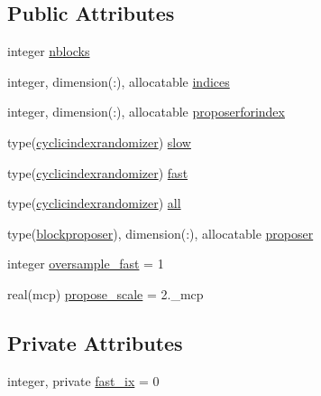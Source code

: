 \subsection*{Public Attributes}
\begin{DoxyCompactItemize}
\item 
integer \mbox{\hyperlink{structpropose_1_1blockedproposer_adba94de280db481ba40efdb3bdd6e696}{nblocks}}
\item 
integer, dimension(\+:), allocatable \mbox{\hyperlink{structpropose_1_1blockedproposer_acbf4ad1e59f261b8484ac0fcef24dc6c}{indices}}
\item 
integer, dimension(\+:), allocatable \mbox{\hyperlink{structpropose_1_1blockedproposer_a5e08647dcd98493eea7eef238658dfbe}{proposerforindex}}
\item 
type(\mbox{\hyperlink{structpropose_1_1cyclicindexrandomizer}{cyclicindexrandomizer}}) \mbox{\hyperlink{structpropose_1_1blockedproposer_acf2dbf89ad874f8a5c55fc026c12a502}{slow}}
\item 
type(\mbox{\hyperlink{structpropose_1_1cyclicindexrandomizer}{cyclicindexrandomizer}}) \mbox{\hyperlink{structpropose_1_1blockedproposer_a1af5a32aedbd457ab3f0f645dad6ce39}{fast}}
\item 
type(\mbox{\hyperlink{structpropose_1_1cyclicindexrandomizer}{cyclicindexrandomizer}}) \mbox{\hyperlink{structpropose_1_1blockedproposer_a52c508ece4395744d13f023471109156}{all}}
\item 
type(\mbox{\hyperlink{structpropose_1_1blockproposer}{blockproposer}}), dimension(\+:), allocatable \mbox{\hyperlink{structpropose_1_1blockedproposer_a32572d608cf67d16362c9040bd695f9e}{proposer}}
\item 
integer \mbox{\hyperlink{structpropose_1_1blockedproposer_a8f2be12bdb04bc750dfbb92227751441}{oversample\+\_\+fast}} = 1
\item 
real(mcp) \mbox{\hyperlink{structpropose_1_1blockedproposer_aba160a8f4e254ee9fad7e7b2681d136a}{propose\+\_\+scale}} = 2.\+\_\+mcp
\end{DoxyCompactItemize}
\subsection*{Private Attributes}
\begin{DoxyCompactItemize}
\item 
integer, private \mbox{\hyperlink{structpropose_1_1blockedproposer_ad026c4ad761ad38804788798286dc950}{fast\+\_\+ix}} = 0
\end{DoxyCompactItemize}



